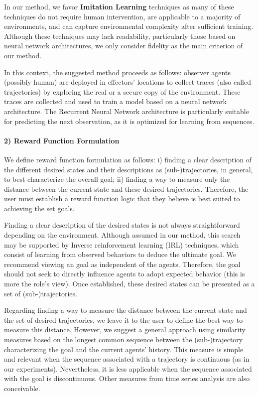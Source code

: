 \documentclass[sigconf,anonymous]{aamas}
\begin{document}
In our method, we favor \textbf{Imitation Learning} techniques as many of these techniques do not require human intervention, are applicable to a majority of environments, and can capture environmental complexity after sufficient training. Although these techniques may lack readability, particularly those based on neural network architectures, we only consider fidelity as the main criterion of our method.

In this context, the suggested method proceeds as follows: observer agents (possibly human) are deployed in effectors' locations to collect traces (also called trajectories) by exploring the real or a secure copy of the environment. These traces are collected and used to train a model based on a neural network architecture. The Recurrent Neural Network architecture is particularly suitable for predicting the next observation, as it is optimized for learning from sequences.

\paragraph{\textbf{2) Reward Function Formulation}} \quad

\noindent We define reward function formulation as follows: \quad i) finding a clear description of the different desired states and their descriptions as (sub-)trajectories, in general, to best characterize the overall goal; \quad ii) finding a way to measure only the distance between the current state and these desired trajectories. Therefore, the user must establish a reward function logic that they believe is best suited to achieving the set goals.

Finding a clear description of the desired states is not always straightforward depending on the environment. Although assumed in our method, this search may be supported by Inverse reinforcement learning (IRL) techniques, which consist of learning from observed behaviors to deduce the ultimate goal. We recommend viewing an goal as independent of the agents. Therefore, the goal should not seek to directly influence agents to adopt expected behavior (this is more the role's view). Once established, these desired states can be presented as a set of (sub-)trajectories.

Regarding finding a way to measure the distance between the current state and the set of desired trajectories, we leave it to the user to define the best way to measure this distance. However, we suggest a general approach using similarity measures based on the longest common sequence between the (sub-)trajectory characterizing the goal and the current agents' history. This measure is simple and relevant when the sequence associated with a trajectory is continuous (as in our experiments). Nevertheless, it is less applicable when the sequence associated with the goal is discontinuous. Other measures from time series analysis are also conceivable.
\end{document}
